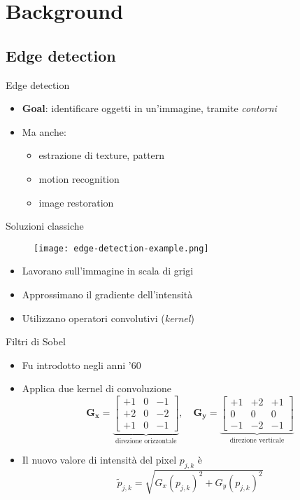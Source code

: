 \section{Background}


\subsection{Edge detection}

\begin{frame}{Edge detection}
	\begin{itemize}
		\item \textbf{Goal}: identificare oggetti in un'immagine, tramite
		\emph{contorni}
		\item Ma anche:
		\begin{itemize}
			\item estrazione di texture, pattern
			\item motion recognition
			\item image restoration
		\end{itemize}
	\end{itemize}
\end{frame}

\begin{frame}{Soluzioni classiche}
	\begin{figure}
		\texttt{[image: edge-detection-example.png]}
	\end{figure}

	\begin{itemize}
		\item Lavorano sull'immagine in scala di grigi
		\item Approssimano il gradiente dell'intensità
		\item Utilizzano operatori convolutivi (\emph{kernel})
	\end{itemize}
\end{frame}

\begin{frame}{Filtri di Sobel}
	\begin{itemize}
		\item Fu introdotto negli anni '60 \cite{SobelFeldman1968IsotropicGradient}
		\item Applica due kernel di convoluzione
		\[
		\mathbf{G_x} =
		\underbrace{
		\begin{bmatrix}
			+1 & 0 & -1 \\
			+2 & 0 & -2 \\
			+1 & 0 & -1
		\end{bmatrix}
		}_{\text{direzione orizzontale}}
		,\quad
		\mathbf{G_y} =
		\underbrace{
		\begin{bmatrix}
			+1 & +2 & +1 \\
			0 & 0 & 0 \\
			-1 & -2 & -1
		\end{bmatrix}
		}_{\text{direzione verticale}
		}
		\]
		\item<2-> Il nuovo valore di intensità del pixel $p_{j,k}$ è
		\[
		\tilde{p}_{j,k} = \sqrt{{G_x(p_{j,k})}^2 + {G_y(p_{j,k})}^2}
		\]
	\end{itemize}
\end{frame}

